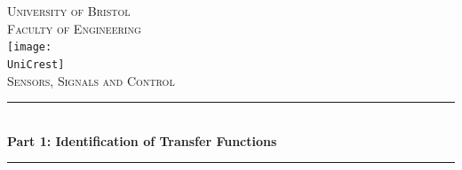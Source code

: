 \documentclass[11pt]{article}
\newcommand{\AssignmentTitle}{Part 1: Identification of Transfer Functions}
\newcommand{\ModuleTitle}{Sensors, Signals and Control}
\newcommand{\University}{University of Bristol}
\newcommand{\Faculty}{Faculty of Engineering}
\newcommand{\UniCrest}{crestbris.png}
\newcommand{\horrule}[1]{\rule{\linewidth}{#1}}
\begin{document}
  \setlength{\abovedisplayskip}{-18pt}
  \setlength{\belowdisplayskip}{0pt}
  \setlength{\abovedisplayshortskip}{-18pt}
  \setlength{\belowdisplayshortskip}{0pt}



\begin{titlepage}

	\center %
		\normalfont \normalsize \textsc{\University} \\ [10pt]
		\normalfont \normalsize \textsc{\Faculty} \\ [25pt]
		\texttt{[image: \\UniCrest]}\\[0.5cm]
		\normalfont \normalsize \textsc{\ModuleTitle} \\ [25pt]
		\horrule{0.5pt} \\[0.4cm]
		\huge \textbf{\AssignmentTitle} \\
		\horrule{2pt} \\[0.5cm]

\end{titlepage}
\end{document}
